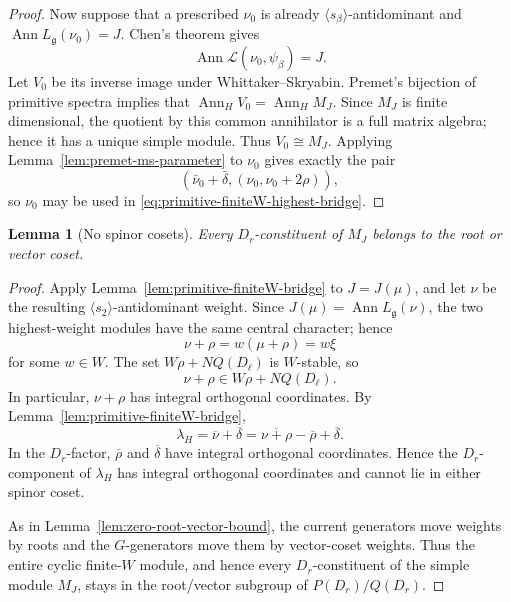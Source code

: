 \documentclass[11pt]{amsart}
\newtheorem{lemma}[theorem]{Lemma}
\theoremstyle{remark}
\numberwithin{equation}{section}
\begin{document}
\begin{proof}
Now suppose that a prescribed \(\nu_0\) is already
\(\langle s_\beta\rangle\)-antidominant and
\(\operatorname{Ann}L_{\mathfrak g}(\nu_0)=J\).  Chen's theorem gives
\[
   \operatorname{Ann}\mathcal L(\nu_0,\psi_\beta)=J.
\]
Let \(V_0\) be its inverse image under Whittaker--Skryabin.  Premet's
bijection of primitive spectra \cite[Theorem~1.2(i)]{Premet2007} implies
that \(\operatorname{Ann}_H V_0=\operatorname{Ann}_H M_J\).  Since
\(M_J\) is finite dimensional, the quotient by this common annihilator is
a full matrix algebra; hence it has a unique simple module.  Thus
\(V_0\cong M_J\).  Applying Lemma~\ref{lem:premet-ms-parameter} to
\(\nu_0\) gives exactly the pair
\[
   \left(
      \bar\nu_0+\bar\delta,
      (\nu_0,\nu_0+2\rho)
   \right),
\]
so \(\nu_0\) may be used in
\eqref{eq:primitive-finiteW-highest-bridge}.
\end{proof}

\begin{lemma}[No spinor cosets]
\label{lem:minimal-no-spinor}
Every \(D_r\)-constituent of \(M_J\) belongs to the root or vector coset.
\end{lemma}

\begin{proof}
Apply Lemma~\ref{lem:primitive-finiteW-bridge} to \(J=J(\mu)\), and let
\(\nu\) be the resulting \(\langle s_2\rangle\)-antidominant weight.  Since
\(J(\mu)=\operatorname{Ann}L_{\mathfrak g}(\nu)\), the two highest-weight
modules have the same central character; hence
\[
   \nu+\rho=w(\mu+\rho)=w\xi
\]
for some \(w\in W\).  The set \(W\rho+NQ(D_\ell)\) is \(W\)-stable, so
\[
   \nu+\rho\in W\rho+NQ(D_\ell).
\]
In particular, \(\nu+\rho\) has integral orthogonal coordinates.  By
Lemma~\ref{lem:primitive-finiteW-bridge},
\begin{equation}
   \lambda_H
   =
   \overline{\nu}+\overline{\delta}
   =
   \overline{\nu+\rho}
   -
   \overline{\rho}
   +
   \overline{\delta}.
\end{equation}
In the \(D_r\)-factor, \(\overline{\rho}\) and
\(\overline{\delta}\) have integral orthogonal coordinates.  Hence the
\(D_r\)-component of \(\lambda_H\) has integral orthogonal coordinates and
cannot lie in either spinor coset.

As in Lemma~\ref{lem:zero-root-vector-bound}, the current generators move
weights by roots and the \(G\)-generators move them by vector-coset weights.
Thus the entire cyclic finite-\(W\) module, and hence every
\(D_r\)-constituent of the simple module \(M_J\), stays in the root/vector
subgroup of \(P(D_r)/Q(D_r)\).
\end{proof}
\end{document}
